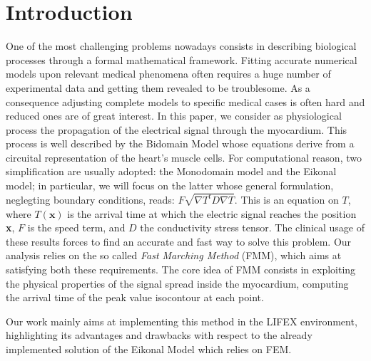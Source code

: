 \documentclass[11pt,a4paper]{article}
\begin{document}



\section{Introduction} \label{sec:introduction}
    
    One of the most challenging problems nowadays consists in describing biological processes through a formal mathematical framework. 
    Fitting accurate numerical models upon relevant medical phenomena often requires a huge number of experimental data and getting them revealed to be troublesome.
    As a consequence adjusting complete models to specific medical cases is often hard and reduced ones are of great interest.
    In this paper, we consider as physiological process the propagation of the electrical signal through the myocardium.
    This process is well described by the Bidomain Model whose equations derive from a circuital representation of the heart's muscle cells. For computational reason, two simplification are usually adopted: the Monodomain model and the Eikonal model; in particular, we will focus on the latter whose general formulation, neglegting boundary conditions, reads:
    $F\sqrt{\nabla T ^t D \nabla T}$. 
    This is an equation on $T$, where $T(\textbf{x})$ is the arrival time at which the electric signal reaches the position \textbf{x}, $F$ is the speed term, and $D$ the conductivity stress tensor.
    The clinical usage of these results forces to find an accurate and fast way to solve this problem. Our analysis relies on the so called \textit{Fast Marching Method} (FMM), which aims at satisfying both these requirements.
    The core idea of FMM consists in exploiting the physical properties of the signal spread inside the myocardium, computing the arrival time of the peak value isocontour at each point.
    
    Our work mainly aims at implementing this method in the LIFEX environment, highlighting its advantages and drawbacks with respect to the already implemented solution of the Eikonal Model which relies on FEM.
    
\end{document}
